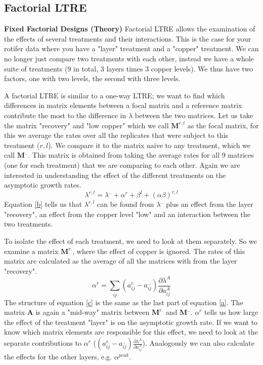 \documentclass{article}\usepackage[]{graphicx}\usepackage[]{color}
\begin{document}
\subsection{Factorial LTRE}
\begin{mdframed}
\textbf{Fixed Factorial Designs (Theory)}
Factorial LTRE allows the examination of the effects of several treatments and their interactions. This is the case for your rotifer data where you have a "layer" treatment and a "copper" treatment. We can no longer just compare two treatments with each other, instead we have a whole suite of treatments (9 in total, 3 layers times 3 copper levels). We thus have two factors, one with two levels, the second with three levels.

A factorial LTRE is similar to a one-way LTRE; we want to find which differences in matrix elements between a focal matrix and a reference matrix contribute the most to the difference in $\lambda$ between the two matrices. Let us take the matrix "recovery" and "low copper" which we call $\boldsymbol{M}^{r,l}$ as the focal matrix, for this we average the rates over all the replicates that were subject to this treatment ($r,l$). We compare it to the matrix naive to any treatment, which we call $\boldsymbol{M}^{..}$. This matrix is obtained from taking the average rates for all 9 matrices (one for each treatment) that we are comparing to each other. Again we are interested in understanding the effect of the different treatments on the asymptotic growth rates.
\begin{equation}\label{b}
\lambda^{r,l}=\lambda^{..}+\alpha^{r}+\beta^{l}+(\alpha \beta)^{r,l}
\end{equation}
Equation \ref{b} tells us that $\lambda^{r,l}$ can be found from $\lambda^{..}$ plus an effect from the layer "recovery", an effect from the copper level "low" and an interaction between the two treatments.

To isolate the effect of each treatment, we need to look at them separately. So we examine a matrix $\boldsymbol{M}^{r.}$, where the effect of copper is ignored. The rates of this matrix are calculated as the average of all the matrices with from the layer "recovery". 
\begin{equation}\label{c}
\alpha^{r}=\sum_{ij}(a^{r.}_{ij}-a^{..}_{ij}) \frac{\partial\lambda^{A}}{\partial a^{A}_{ij}}
\end{equation}
The structure of equation \ref{c} is the same as the last part of equation \ref{a}. The matrix $\boldsymbol{A}$ is again a "mid-way" matrix between $\boldsymbol{M}^{r.}$ and $\boldsymbol{M}^{..}$. $\alpha^{r}$ tells us how large the effect of the treatment "layer" is on the asymptotic growth rate. If we want to know which matrix elements are responsible for this effect, we need to look at the separate contributions to $\alpha^r$ ($(a^{r.}_{ij}-a^{..}_{ij}) \frac{\partial\lambda^{A}}{\partial a^{A}_{ij}}$). Analogously we can also calculate the effects for the other layers, e.g. $\alpha^{peak}$.


\end{mdframed}
\end{document}
